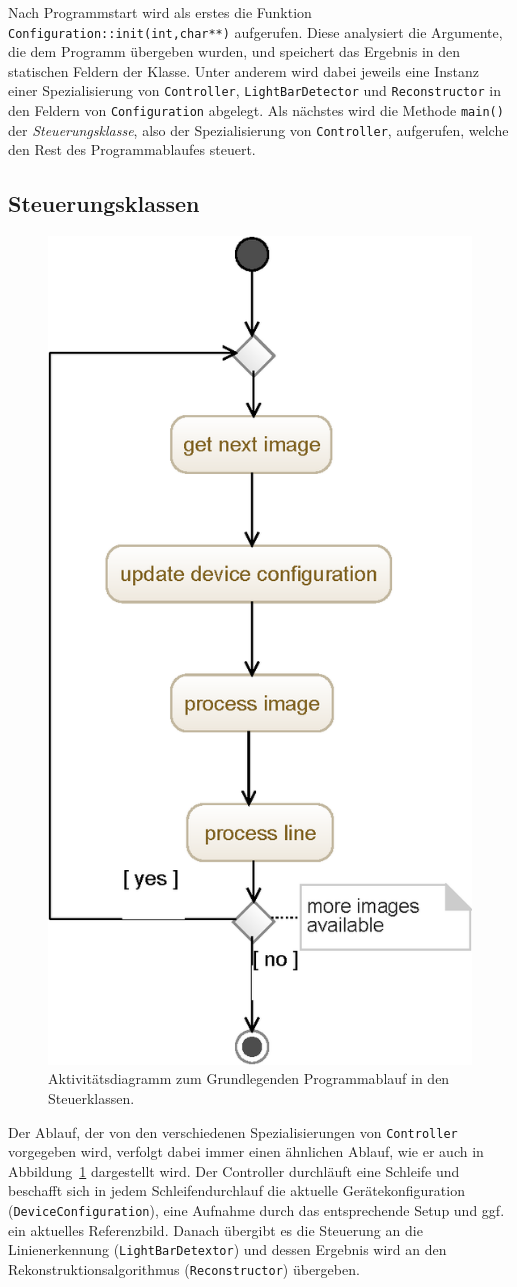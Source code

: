 \documentclass[ngerman,a4paper,parskip=half]{scrartcl}
\begin{document}
Nach Programmstart wird als erstes die Funktion \texttt{Configuration::init(int,char**)} aufgerufen. Diese analysiert die Argumente, die dem Programm übergeben wurden, und speichert das Ergebnis in den statischen Feldern der Klasse. Unter anderem wird dabei jeweils eine Instanz einer Spezialisierung von \texttt{Controller}, \texttt{LightBarDetector} und \texttt{Reconstructor} in den Feldern von \texttt{Configuration} abgelegt. Als nächstes wird die Methode \texttt{main()} der \emph{Steuerungsklasse}, also der Spezialisierung von \texttt{Controller}, aufgerufen, welche den Rest des Programmablaufes steuert.

\subsection{Steuerungsklassen}
\label{sec:controller}

\begin{figure}
	\centering
	\includegraphics[width=0.4\linewidth]{includes/software_controller}
	\caption{Aktivitätsdiagramm zum Grundlegenden Programmablauf in den Steuerklassen.}
	\label{fig:software_controller}
\end{figure}

Der Ablauf, der von den verschiedenen Spezialisierungen von \texttt{Controller} vorgegeben wird, verfolgt dabei immer einen ähnlichen Ablauf, wie er auch in Abbildung~\ref{fig:software_controller} dargestellt wird. Der Controller durchläuft eine Schleife und beschafft sich in jedem Schleifendurchlauf die aktuelle Gerätekonfiguration (\texttt{DeviceConfiguration}), eine Aufnahme durch das entsprechende Setup und ggf. ein aktuelles Referenzbild. Danach übergibt es die Steuerung an die Linienerkennung (\texttt{LightBarDetextor}) und dessen Ergebnis wird an den Rekonstruktionsalgorithmus (\texttt{Reconstructor}) übergeben.
\end{document}
